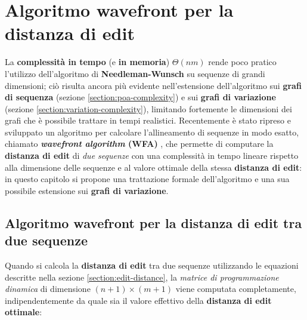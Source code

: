 \chapter{Algoritmo wavefront per la distanza di edit}
    La \textbf{complessità in tempo} (e \textbf{in memoria}) $\Theta(n m)$ rende poco pratico l'utilizzo dell'algoritmo di \textbf{Needleman-Wunsch} \cite{NeedlemanWunsch} su sequenze di grandi dimensioni; ciò risulta ancora più evidente nell'estensione dell'algoritmo sui \textbf{grafi di sequenza} (sezione \ref{section:poa-complexity}) e sui \textbf{grafi di variazione} (sezione \ref{section:variation-complexity}), limitando fortemente le dimensioni dei grafi che è possibile trattare in tempi realistici. Recentemente è stato ripreso e sviluppato \cite{WFA_edit-distance} un algoritmo per calcolare l'allineamento di sequenze in modo esatto, chiamato \textbf{\textit{wavefront algorithm} (WFA)} \cite{UKKONEN1985100}, che permette di computare la \textbf{distanza di edit} di \emph{due sequenze} con una complessità in tempo lineare rispetto alla dimensione delle sequenze e al valore ottimale della stessa \textbf{distanza di edit}: in questo capitolo si propone una trattazione formale dell'algoritmo e una sua possibile estensione sui \textbf{grafi di variazione}. 
\label{section:wfa}

\section{Algoritmo wavefront per la distanza di edit tra due sequenze}
    Quando si calcola la \textbf{distanza di edit} tra due sequenze utilizzando le equazioni descritte nella sezione \ref{section:edit-distance}, la \emph{matrice di programmazione dinamica} di dimensione $(n + 1) \times (m + 1)$ viene computata completamente, indipendentemente da quale sia il valore effettivo della \textbf{distanza di edit ottimale}:
\clearpage

